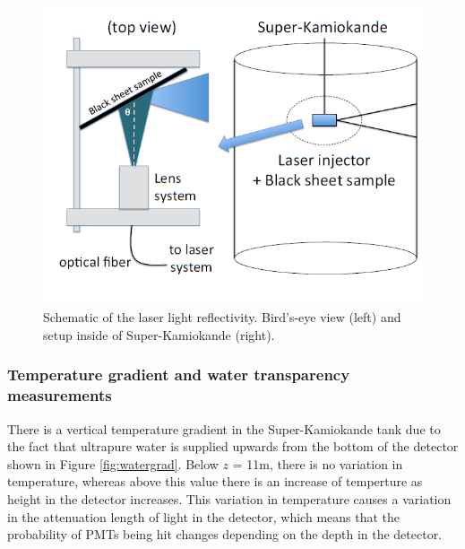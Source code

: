 \begin{figure}
    \includegraphics[width=\textwidth]{Figures/blacksheetrefsetup.png}
\caption{Schematic of the laser light reflectivity. Bird's-eye view (left) and setup inside of Super-Kamiokande (right).}
    \label{fig:blacksheetrefsetup}
\end{figure}

\subsubsection{Temperature gradient and water transparency measurements}
There is a vertical temperature gradient in the Super-Kamiokande tank due to the fact that ultrapure water is supplied upwards from the bottom of the detector shown in Figure \ref{fig:watergrad}. Below $z$ = 11m, there is no variation in temperature, whereas above this value there is an increase of temperture as height in the detector increases. This variation in temperature causes a variation in the attenuation length of light in the detector, which means that the probability of PMTs being hit changes depending on the depth in the detector. 

